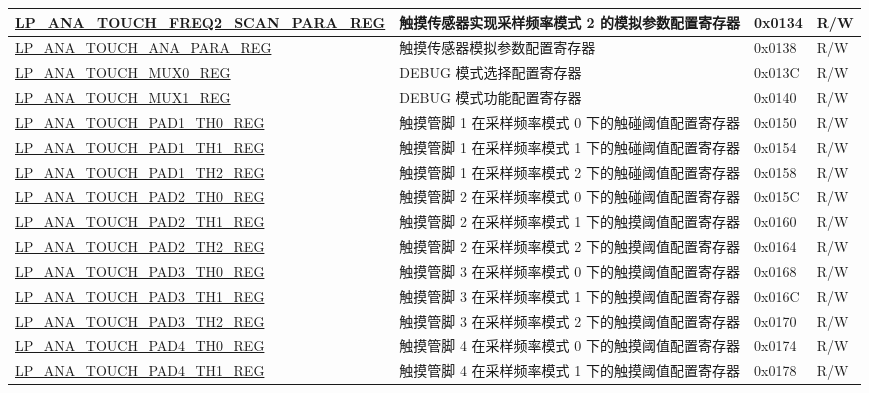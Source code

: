 \begin{longtable}{ | l| p{10cm} | p{1.3cm} | p{1cm} | }
\hyperref[regdesc:LPANATOUCHFREQ0SCANPARAREG]{LP\_ANA\_TOUCH\_FREQ2\_SCAN\_PARA\_REG} & 触摸传感器实现采样频率模式 2 的模拟参数配置寄存器 & 0x0134 & R/W \\ \hline
\hyperref[regdesc:LPANATOUCHANAPARAREG]{LP\_ANA\_TOUCH\_ANA\_PARA\_REG} & 触摸传感器模拟参数配置寄存器 & 0x0138 & R/W \\ \hline
\hyperref[regdesc:LPANATOUCHMUX0REG]{LP\_ANA\_TOUCH\_MUX0\_REG} & DEBUG 模式选择配置寄存器 & 0x013C & R/W \\ \hline
\hyperref[regdesc:LPANATOUCHMUX1REG]{LP\_ANA\_TOUCH\_MUX1\_REG} & DEBUG 模式功能配置寄存器 & 0x0140 & R/W \\ \hline
\hyperref[regdesc:LPANATOUCHPAD0TH0REG]{LP\_ANA\_TOUCH\_PAD1\_TH0\_REG} & 触摸管脚 1 在采样频率模式 0 下的触碰阈值配置寄存器 & 0x0150 & R/W \\ \hline
\hyperref[regdesc:LPANATOUCHPAD0TH1REG]{LP\_ANA\_TOUCH\_PAD1\_TH1\_REG} & 触摸管脚 1 在采样频率模式 1 下的触碰阈值配置寄存器 & 0x0154 & R/W \\ \hline
\hyperref[regdesc:LPANATOUCHPAD0TH2REG]{LP\_ANA\_TOUCH\_PAD1\_TH2\_REG} & 触摸管脚 1 在采样频率模式 2 下的触碰阈值配置寄存器 & 0x0158 & R/W \\ \hline
\hyperref[regdesc:LPANATOUCHPAD0TH0REG]{LP\_ANA\_TOUCH\_PAD2\_TH0\_REG} & 触摸管脚 2 在采样频率模式 0 下的触碰阈值配置寄存器 & 0x015C & R/W \\ \hline
\hyperref[regdesc:LPANATOUCHPAD0TH1REG]{LP\_ANA\_TOUCH\_PAD2\_TH1\_REG} & 触摸管脚 2 在采样频率模式 1 下的触摸阈值配置寄存器 & 0x0160 & R/W \\ \hline
\hyperref[regdesc:LPANATOUCHPAD0TH2REG]{LP\_ANA\_TOUCH\_PAD2\_TH2\_REG} & 触摸管脚 2 在采样频率模式 2 下的触摸阈值配置寄存器 & 0x0164 & R/W \\ \hline
\hyperref[regdesc:LPANATOUCHPAD0TH0REG]{LP\_ANA\_TOUCH\_PAD3\_TH0\_REG} & 触摸管脚 3 在采样频率模式 0 下的触摸阈值配置寄存器 & 0x0168 & R/W \\ \hline
\hyperref[regdesc:LPANATOUCHPAD0TH1REG]{LP\_ANA\_TOUCH\_PAD3\_TH1\_REG} & 触摸管脚 3 在采样频率模式 1 下的触摸阈值配置寄存器 & 0x016C & R/W \\ \hline
\hyperref[regdesc:LPANATOUCHPAD0TH2REG]{LP\_ANA\_TOUCH\_PAD3\_TH2\_REG} & 触摸管脚 3 在采样频率模式 2 下的触摸阈值配置寄存器 & 0x0170 & R/W \\ \hline
\hyperref[regdesc:LPANATOUCHPAD0TH0REG]{LP\_ANA\_TOUCH\_PAD4\_TH0\_REG} & 触摸管脚 4 在采样频率模式 0 下的触摸阈值配置寄存器 & 0x0174 & R/W \\ \hline
\hyperref[regdesc:LPANATOUCHPAD0TH1REG]{LP\_ANA\_TOUCH\_PAD4\_TH1\_REG} & 触摸管脚 4 在采样频率模式 1 下的触摸阈值配置寄存器 & 0x0178 & R/W \\ \hline

\end{longtable}

